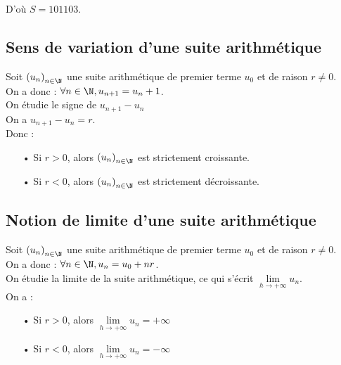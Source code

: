 D'où $S = 101 103$.

\subsection{Sens de variation d'une suite arithmétique}

Soit $\left(u_n\right)_{n \in \N}$ une suite arithmétique de premier terme $u_0$ et de raison $r \neq 0$. \\

On a donc : $\forall n \in \N, u_{n+1} = u_n + 1$. \\

On étudie le signe de $u_{n+1} - u_{n}$ \\

On a  $u_{n+1} - u_{n} = r$. \\

Donc :

\begin{itemize}
\item[•] Si $r > 0$, alors $\left(u_n\right)_{n \in \N}$ est strictement croissante. 
\item[•] Si $r < 0$, alors $\left(u_n\right)_{n \in \N}$ est strictement décroissante. 
\end{itemize}

\subsection{Notion de limite d'une suite arithmétique}

Soit $\left(u_n\right)_{n \in \N}$ une suite arithmétique de premier terme $u_0$ et de raison $r \neq 0$. \\

On a donc : $\forall n \in \N, u_{n} = u_0 + nr$. \\

On étudie la limite de la suite arithmétique, ce qui s'écrit $\lim\limits_{h \to +\infty} u_n$. \\

On a :

\begin{itemize}
\item[•] Si $r > 0$, alors $\lim\limits_{h \to +\infty} u_n = +\infty$ 
\item[•] Si $r < 0$, alors $\lim\limits_{h \to +\infty} u_n = -\infty$ 
\end{itemize}

\vspace*{-5cm}

